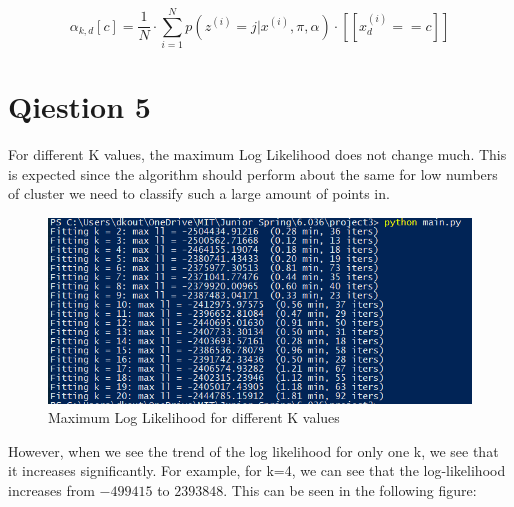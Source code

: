 \documentclass[letterpaper, 12pt]{article}
\begin{document}
\begin{equation*}
    \alpha_{k,d}[c] = \frac{1}{N} \cdot
    \sum^N_{i=1} p(z^{(i)}=j \vert x^{(i)}, \pi, \alpha) \cdot [\![x_d^{(i)} == c]\!]
\end{equation*}

\section*{Qiestion 5}
For different K values, the maximum Log Likelihood does not change much. This is expected since the algorithm should perform about the same for low numbers of cluster we need to classify such a large amount of points in.

\begin{figure}[h!]
    \centering
    \includegraphics[scale=0.9]{25LL}
    \caption {Maximum Log Likelihood for different K values}
\end{figure}

However, when we see the trend of the log likelihood for only one k, we see that it increases significantly. For example, for k=4, we can see that the log-likelihood increases from $-499415$ to $2393848$. This can be seen in the following figure:
\end{document}
